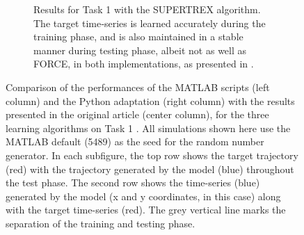 \begin{figure}
\begin{subfigure}{\textwidth}
    \caption{Results for Task 1 with the SUPERTREX algorithm. The target time‐series is learned accurately during the training phase, and is also maintained in a stable manner during testing phase, albeit not as well as FORCE, in both implementations, as presented in \cite{pyle2019}.}
    \label{Fig:compTask1ST}
    
    \end{subfigure}


\caption{Comparison of the performances of the MATLAB scripts (left column) and the Python adaptation (right column) with the results presented in the original article (center column), for the three learning algorithms on Task 1 \cite{pyle2019}. All simulations shown here use the MATLAB default (5489) as the seed for the random number generator. In each subfigure, the top row shows the target trajectory (red) with the trajectory generated by the model (blue) throughout the test phase. The second row shows the time-series (blue) generated by the model (x and y coordinates, in this case) along with the target time-series (red). The grey vertical line marks the separation of the training and testing phase.}
\label{Fig:Comparison_Task1}

\end{figure}


